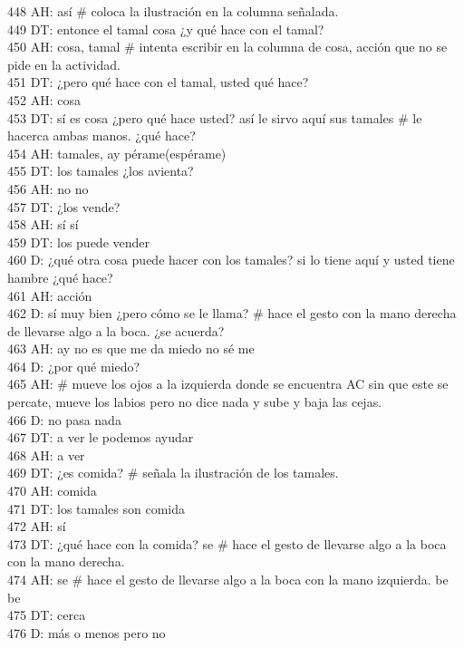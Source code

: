 448 AH: así \# coloca la ilustración en la columna señalada.\\
449 DT: entonce el tamal cosa ¿y qué hace con el tamal?\\
450 AH: cosa, tamal \# intenta escribir en la columna de cosa, acción que no se pide en la actividad.\\
451 DT: ¿pero qué hace con el tamal, usted qué hace?\\
452 AH: cosa\\
453 DT: sí es cosa ¿pero qué hace usted? así le sirvo aquí sus tamales \# le hacerca ambas manos. ¿qué hace?\\
454 AH: tamales, ay pérame(espérame)\\
455 DT: los tamales ¿los avienta?\\
456 AH: no no\\
457 DT: ¿los vende?\\
458 AH: sí sí\\
459 DT: los puede vender\\
460 D: ¿qué otra cosa puede hacer con los tamales? si lo tiene aquí y usted tiene hambre ¿qué hace?\\
461 AH: acción\\
462 D: sí muy bien ¿pero cómo se le llama? \# hace el gesto con la mano derecha de llevarse algo a la boca. ¿se acuerda? \\
463 AH: ay no es que me da miedo no sé me \\
464 D: ¿por qué miedo?\\
465 AH: \# mueve los ojos a la izquierda donde se encuentra AC sin que este se percate, mueve los labios pero no dice nada y sube y baja las cejas.\\
466 D: no pasa nada\\
467 DT: a ver le podemos ayudar\\
468 AH: a ver\\
469 DT: ¿es comida? \# señala la ilustración de los tamales.\\
470 AH: comida\\
471 DT: los tamales son comida\\
472 AH: sí\\
473 DT: ¿qué hace con la comida? se \# hace el gesto de llevarse algo a la boca con la mano derecha.\\
474 AH: se \# hace el gesto de llevarse algo a la boca con la mano izquierda. be be\\
475 DT: cerca\\
476 D: más o menos pero no\\
